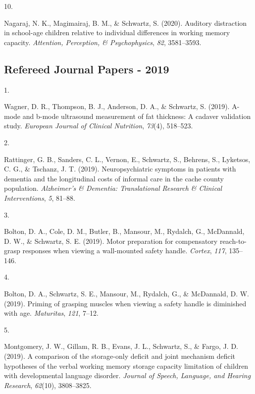 \documentclass[11pt,a4paper,]{moderncv}
\newlength{\csllabelwidth}
\newcommand{\CSLLeftMargin}[1]{\parbox[t]{\csllabelwidth}{#1}}
\newcommand{\CSLRightInline}[1]{\parbox[t]{\linewidth - \csllabelwidth}{#1}}
\begin{document}
\leavevmode{}%
\CSLLeftMargin{10. }
\CSLRightInline{Nagaraj, N. K., Magimairaj, B. M., \& Schwartz, S.
(2020). Auditory distraction in school-age children relative to
individual differences in working memory capacity. \emph{Attention,
Perception, \& Psychophysics}, \emph{82}, 3581--3593.}

\vspace{7mm}

\hypertarget{refereed-journal-papers---2019}{%
\subsection{\texorpdfstring{\textbf{Refereed Journal Papers -
2019}}{Refereed Journal Papers - 2019}}\label{refereed-journal-papers---2019}}

\hypertarget{refs_journals2019}{}
\leavevmode{}%
\CSLLeftMargin{1. }
\CSLRightInline{Wagner, D. R., Thompson, B. J., Anderson, D. A., \&
Schwartz, S. (2019). A-mode and b-mode ultrasound measurement of fat
thickness: A cadaver validation study. \emph{European Journal of
Clinical Nutrition}, \emph{73}(4), 518--523.}

\leavevmode{}%
\CSLLeftMargin{2. }
\CSLRightInline{Rattinger, G. B., Sanders, C. L., Vernon, E., Schwartz,
S., Behrens, S., Lyketsos, C. G., \& Tschanz, J. T. (2019).
Neuropsychiatric symptoms in patients with dementia and the longitudinal
costs of informal care in the cache county population. \emph{Alzheimer's
\& Dementia: Translational Research \& Clinical Interventions},
\emph{5}, 81--88.}

\leavevmode{}%
\CSLLeftMargin{3. }
\CSLRightInline{Bolton, D. A., Cole, D. M., Butler, B., Mansour, M.,
Rydalch, G., McDannald, D. W., \& Schwartz, S. E. (2019). Motor
preparation for compensatory reach-to-grasp responses when viewing a
wall-mounted safety handle. \emph{Cortex}, \emph{117}, 135--146.}

\leavevmode{}%
\CSLLeftMargin{4. }
\CSLRightInline{Bolton, D. A., Schwartz, S. E., Mansour, M., Rydalch,
G., \& McDannald, D. W. (2019). Priming of grasping muscles when viewing
a safety handle is diminished with age. \emph{Maturitas}, \emph{121},
7--12.}

\leavevmode{}%
\CSLLeftMargin{5. }
\CSLRightInline{Montgomery, J. W., Gillam, R. B., Evans, J. L.,
Schwartz, S., \& Fargo, J. D. (2019). A comparison of the storage-only
deficit and joint mechanism deficit hypotheses of the verbal working
memory storage capacity limitation of children with developmental
language disorder. \emph{Journal of Speech, Language, and Hearing
Research}, \emph{62}(10), 3808--3825.}
\end{document}
